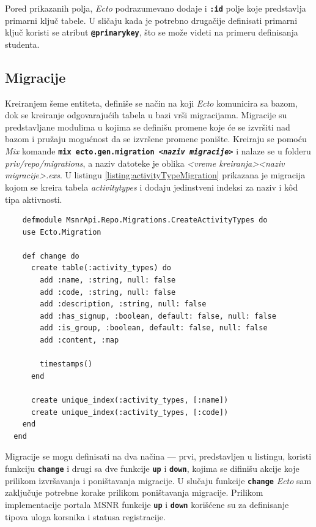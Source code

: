 \documentclass[12pt,oneside]{memoir}
\begin{document}
Pored prikazanih polja, \emph{Ecto} podrazumevano dodaje i \texttt{\textbf{:id}} polje
koje predstavlja primarni ključ tabele. U sličaju kada je potrebno drugačije definisati primarni ključ koristi
se atribut \texttt{\textbf{@primary{\textunderscore}key}}, što se može videti na primeru definisanja studenta.

\subsection{Migracije}
Kreiranjem šeme entiteta, definiše se način na koji \emph{Ecto} komunicira sa bazom, dok se kreiranje odgovarajućih
tabela u bazi vrši migracijama. Migracije su predstavljane modulima u kojima se definišu promene koje će se izvršiti nad
bazom i pružaju mogućnost da se izvršene promene ponište. Kreiraju se pomoću \emph{Mix} komande 
\texttt{\textbf{mix ecto.gen.migration \emph{<naziv migracije>}}} i nalaze se u folderu
\emph{priv/repo/migrations}, a naziv datoteke je oblika \emph{<vreme kreiranja>{\textunderscore}<naziv migracije>.exs}.
U listingu \ref{listing:activityTypeMigration} prikazana je migracija kojom se kreira tabela \emph{activity{\textunderscore}types} i
dodaju jedinstveni indeksi za naziv i k\^{o}d tipa aktivnosti.
\begin{listing}[!h]
  \begin{verbatim}
    defmodule MsnrApi.Repo.Migrations.CreateActivityTypes do
    use Ecto.Migration
  
    def change do
      create table(:activity_types) do
        add :name, :string, null: false
        add :code, :string, null: false
        add :description, :string, null: false
        add :has_signup, :boolean, default: false, null: false
        add :is_group, :boolean, default: false, null: false
        add :content, :map
  
        timestamps()
      end
  
      create unique_index(:activity_types, [:name])
      create unique_index(:activity_types, [:code])
    end
  end
\end{verbatim}
\caption{Migracija za kreiranje tabele \emph{activity{\textunderscore}types}}
\label{listing:activityTypeMigration}
\end{listing}

Migracije se mogu definisati na dva načina --- prvi, predstavljen u listingu, koristi funkciju \texttt{\textbf{change}}
i drugi sa dve funkcije \texttt{\textbf{up}} i \texttt{\textbf{down}}, kojima se difinišu akcije koje prilikom izvršavanja i
poništavanja migracije. U slučaju funkcije \texttt{\textbf{change}} \emph{Ecto} sam zaključuje potrebne korake prilikom
poništavanja migracije. Prilikom implementacije portala MSNR funkcije \texttt{\textbf{up}} i \texttt{\textbf{down}} korišćene
su za definisanje tipova uloga korsnika i statusa registracije.
\end{document}
